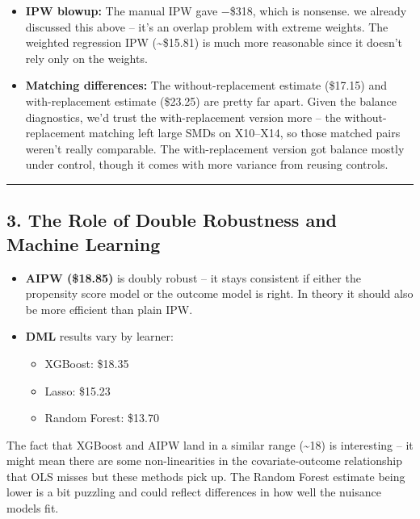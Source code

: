 \documentclass[
  letterpaper,
  DIV=11,
  numbers=noendperiod]{scrartcl}
\providecommand{\tightlist}{%
  \setlength{\itemsep}{0pt}\setlength{\parskip}{0pt}}
\begin{document}
\begin{itemize}
\tightlist
\item
  \textbf{IPW blowup:} The manual IPW gave −\$318, which is nonsense. we
  already discussed this above -- it's an overlap problem with extreme
  weights. The weighted regression IPW (\textasciitilde\$15.81) is much
  more reasonable since it doesn't rely only on the weights.
\item
  \textbf{Matching differences:} The without-replacement estimate
  (\$17.15) and with-replacement estimate (\$23.25) are pretty far
  apart. Given the balance diagnostics, we'd trust the with-replacement
  version more -- the without-replacement matching left large SMDs on
  X10--X14, so those matched pairs weren't really comparable. The
  with-replacement version got balance mostly under control, though it
  comes with more variance from reusing controls.
\end{itemize}

\begin{center}\rule{0.5\linewidth}{0.5pt}\end{center}

\subsection{3. The Role of Double Robustness and Machine
Learning}\label{the-role-of-double-robustness-and-machine-learning}

\begin{itemize}
\tightlist
\item
  \textbf{AIPW (\$18.85)} is doubly robust -- it stays consistent if
  either the propensity score model or the outcome model is right. In
  theory it should also be more efficient than plain IPW.
\item
  \textbf{DML} results vary by learner:

  \begin{itemize}
  \tightlist
  \item
    XGBoost: \$18.35
  \item
    Lasso: \$15.23
  \item
    Random Forest: \$13.70
  \end{itemize}
\end{itemize}

The fact that XGBoost and AIPW land in a similar range
(\textasciitilde18) is interesting -- it might mean there are some
non-linearities in the covariate-outcome relationship that OLS misses
but these methods pick up. The Random Forest estimate being lower is a
bit puzzling and could reflect differences in how well the nuisance
models fit.
\end{document}
